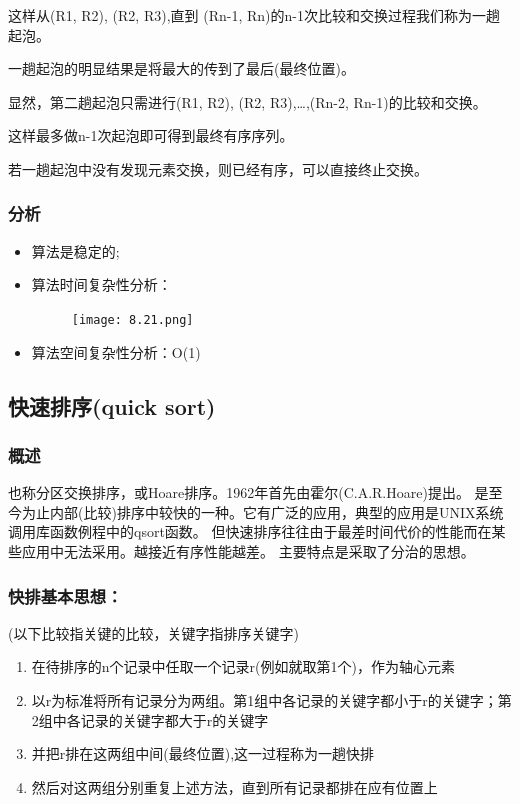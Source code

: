 \documentclass[AutoFakeBold]{LZUThesis2007}
\begin{document}
这样从(R1, R2), (R2, R3),直到 (Rn-1, Rn)的n-1次比较和交换过程我们称为一趟起泡。

一趟起泡的明显结果是将最大的传到了最后(最终位置)。

显然，第二趟起泡只需进行(R1, R2), (R2, R3),…,(Rn-2, Rn-1)的比较和交换。

这样最多做n-1次起泡即可得到最终有序序列。

若一趟起泡中没有发现元素交换，则已经有序，可以直接终止交换。

			\subsubsection{分析}
\begin{itemize}
	\item 算法是稳定的;      
	\item 算法时间复杂性分析：
\begin{figure}[H]
    \centering
    \texttt{[image: 8.21.png]}

\end{figure}
	\item 算法空间复杂性分析：O(1)
\end{itemize}
		\subsection{快速排序(quick sort)}
			\subsubsection{概述}
        也称分区交换排序，或Hoare排序。1962年首先由霍尔(C.A.R.Hoare)提出。
是至今为止内部(比较)排序中较快的一种。它有广泛的应用，典型的应用是UNIX系统调用库函数例程中的qsort函数。
       但快速排序往往由于最差时间代价的性能而在某些应用中无法采用。越接近有序性能越差。
        主要特点是采取了分治的思想。
			\subsubsection{快排基本思想：}
(以下比较指关键的比较，关键字指排序关键字)
\begin{enumerate}
	\item 在待排序的n个记录中任取一个记录r(例如就取第1个)，作为轴心元素
	\item 以r为标准将所有记录分为两组。第1组中各记录的关键字都小于r的关键字；第2组中各记录的关键字都大于r的关键字
	\item 并把r排在这两组中间(最终位置),这一过程称为一趟快排
	\item 然后对这两组分别重复上述方法，直到所有记录都排在应有位置上
\end{enumerate}         
\end{document}
